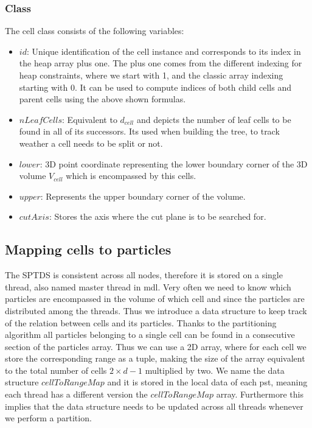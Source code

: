 \documentclass[]{article}
\begin{document}
\subsubsection{Class}
The cell class consists of the following variables:

\begin{itemize}
	\item $id$: Unique identification of the cell instance and corresponds to its index in the heap array plus one. The plus one comes from the different indexing for heap constraints, where we start with 1, and the classic array indexing starting with 0. It can be used to compute  indices of both child cells and parent cells using the above shown formulas.
	\item $nLeafCells$: Equivalent to  $d_{cell}$ and depicts the number of leaf cells to be found in all of its successors. Its used when building the tree, to track weather a cell needs to be split or not. 
	\item $lower$: 3D point coordinate representing the lower boundary corner of the 3D volume $V_{cell}$ which is encompassed by this cells.
	\item $upper$: Represents the upper boundary corner of the volume.	
	\item $cutAxis$: Stores the axis where the cut plane is to be searched for. 
\end{itemize}

\subsection{Mapping cells to particles}

The SPTDS is consistent across all nodes, therefore it is stored on a single thread, also named master thread in mdl. Very often we need to know which particles are encompassed in the volume of which cell and since the particles are distributed among the threads. Thus we introduce a data structure to keep track of the relation between cells and its particles. 
Thanks to the partitioning algorithm all particles belonging to a single cell can be found in a consecutive section of the particles array. Thus we can use a 2D array, where for each cell we store the corresponding range as a tuple, making the size of the array equivalent to the total number of cells $2 \times d -1$ multiplied by two. We name the data structure $cellToRangeMap$ and it is stored in the local data of each pst, meaning each thread has a different version the $cellToRangeMap$ array. Furthermore this implies that the data structure needs to be updated across all threads whenever we perform a partition.
\end{document}

